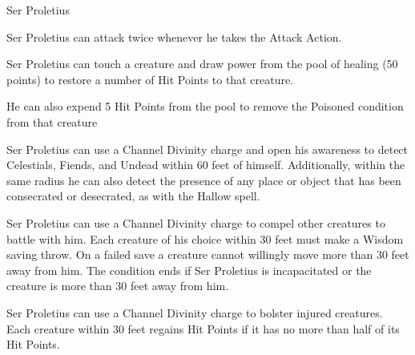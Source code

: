 \begin{DndMonster}[width=\textwidth + 8pt]{Ser Proletius}
\begin{multicols}{2}
		Ser Proletius can attack twice whenever he takes the Attack Action.
		
		\DndMonsterAttack[
			name=Longsword,
			distance=melee, %
			mod=+9,
			reach=5,
			targets=one target,
			dmg=\DndDice{1d8 + 5},
			dmg-type=slashing,
			or-dmg=\DndDice{1d10 + 5},
			or-dmg-when={when used with two hands},
			extra={. The creature hit with this attack has Disadvantage on its next attack roll before the start of Ser Proletius' next turn},
		]
		
		\DndMonsterAttack[
			name=Javelin,
			distance=ranged, %
			mod=+9,
			range=30/120,
			targets=one target,
			dmg=\DndDice{1d6 + 5},
			dmg-type=piercing,
			extra={. A creature hit with this attack has its speed reduced by 10 feet, up to a maximum reduction of 10 feet},
		]
		
		Ser Proletius can touch a creature and draw power from the pool of healing (50 points) to restore a number of Hit Points to that creature.
		
		He can also expend 5 Hit Points from the pool to remove the Poisoned condition from that creature
		
		Ser Proletius can use a Channel Divinity charge and open his awareness to detect Celestials, Fiends, and Undead within 60 feet of himself. Additionally, within the same radius he can also detect the presence of any place or object that has been consecrated or desecrated, as with the Hallow spell.
		
		Ser Proletius can use a Channel Divinity charge to compel other creatures to battle with him. Each creature of his choice within 30 feet must make a Wisdom saving throw. On a failed save a creature cannot willingly move more than 30 feet away from him. The condition ends if Ser Proletius is incapacitated or the creature is more than 30 feet away from him.
		
		Ser Proletius can use a Channel Divinity charge to bolster injured creatures. Each creature within 30 feet regains  Hit Points if it has no more than half of its Hit Points.
		

\end{multicols}
\end{DndMonster}
